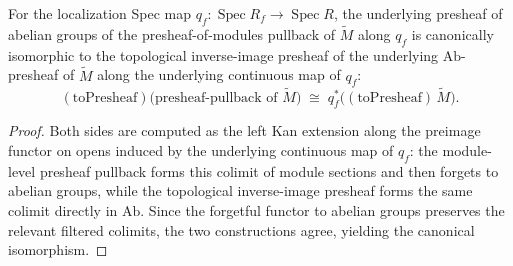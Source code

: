 \begin{lemma}
  \label{lem:tilde_pullback_stalk_presheafPullback_toPresheaf_bridge}
  For the localization Spec map \(q_f:\operatorname{Spec}R_f\to\operatorname{Spec}R\), the
  underlying presheaf of abelian groups of the presheaf-of-modules pullback of
  \(\widetilde M\) along \(q_f\) is canonically isomorphic to the topological inverse-image
  presheaf of the underlying \(\mathrm{Ab}\)-presheaf of \(\widetilde M\) along the
  underlying continuous map of \(q_f\):
  \[
    (\mathrm{toPresheaf})\bigl(\text{presheaf-pullback of }\widetilde M\bigr)
    \;\cong\;q_f^{*}\bigl((\mathrm{toPresheaf})\,\widetilde M\bigr).
  \]
\end{lemma}

\begin{proof}
  Both sides are computed as the left Kan extension along the preimage functor on opens
  induced by the underlying continuous map of \(q_f\): the module-level presheaf pullback
  forms this colimit of module sections and then forgets to abelian groups, while the
  topological inverse-image presheaf forms the same colimit directly in \(\mathrm{Ab}\).
  Since the forgetful functor to abelian groups preserves the relevant filtered colimits,
  the two constructions agree, yielding the canonical isomorphism.
\end{proof}


